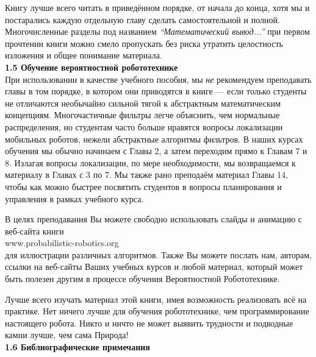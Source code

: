 \documentclass[10pt,a4paper]{article}
\begin{document}
Книгу лучше всего читать в приведённом порядке, от начала до конца, хотя мы и постарались  каждую отдельную главу сделать самостоятельной и полной. Многочисленные разделы под названием \textit{“Математический вывод...”} при первом прочтении книги можно смело пропускать  без риска утратить целостность изложения и общее понимание материала.\\

\textbf{1.5 Обучение вероятностной робототехнике}\\

При использовании в качестве учебного пособия, мы \textit{не} рекомендуем преподавать главы в том порядке, в котором они приводятся в книге — если только студенты не отличаются необычайно сильной тягой к абстрактным математическим концепциям. Многочастичные фильтры легче объяснить, чем нормальные распределения, но студентам часто больше нравятся вопросы локализации мобильных роботов, нежели абстрактные алгоритмы фильтров. В наших курсах обучения мы обычно начинаем с Главы 2, а затем переходим прямо к Главам 7 и 8. Излагая вопросы локализации, по мере необходимости, мы возвращаемся к материалу в Главах с 3 по 7. Мы также рано преподаём материал Главы 14, чтобы как можно быстрее посвятить студентов в вопросы планирования и управления в рамках учебного курса.

В целях  преподавания Вы можете свободно использовать слайды и анимацию с веб-сайта книги\\
\hspace*{40mm} www.probabilistic-robotics.org \\
для иллюстрации различных алгоритмов. Также Вы можете послать нам, авторам, ссылки на веб-сайты Ваших учебных курсов и любой материал, который может быть полезен другим в процессе обучения Вероятностной Робототехнике.
 
Лучше всего изучать материал этой книги, имея возможность реализовать всё на практике. Нет ничего лучше для обучения робототехнике, чем программирование настоящего робота. Никто и ничто не может выявить трудности и подводные камни лучше, чем сама Природа!\\

\textbf{1.6 Библиографические примечания}\\
\end{document}
